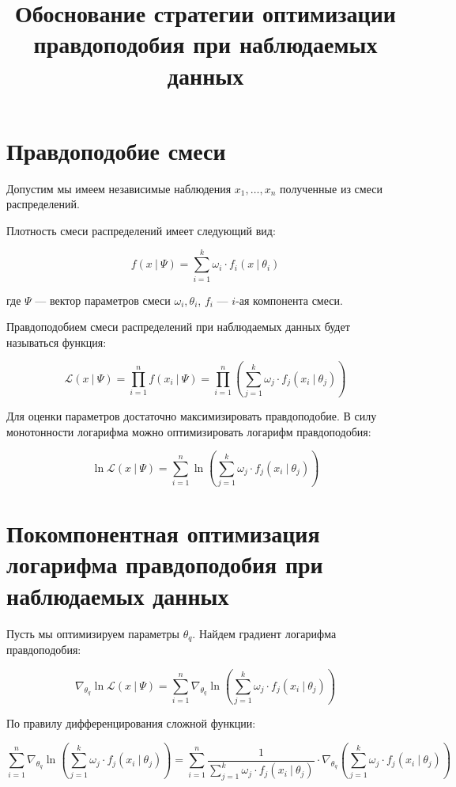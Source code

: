\documentclass[14pt, a4paper, oneside]{memoir}
\title{Обоснование стратегии оптимизации правдоподобия при наблюдаемых данных}
\begin{document}
\begin{titlingpage}
	\maketitle
\end{titlingpage}

\section{Правдоподобие смеси}

Допустим мы имеем независимые наблюдения $x_1, \dots, x_n$ полученные из смеси распределений.

Плотность смеси распределений имеет следующий вид:

\[f(x ~|~ \Psi) = \sum_{i=1}^k \omega_i \cdot f_i (x~|~\theta_i)\]

где $\Psi$ --- вектор параметров смеси $\omega_i, \theta_i$, $f_i$ --- $i$-ая компонента смеси.

Правдоподобием смеси распределений при наблюдаемых данных будет называться функция:

\[\mathcal{L}(x ~|~ \Psi) = \prod_{i=1}^n f(x_i ~|~ \Psi) = \prod_{i=1}^n \left(\sum_{j=1}^k \omega_j \cdot f_j(x_i ~|~ \theta_j)\right)\]

Для оценки параметров достаточно максимизировать правдоподобие. В силу монотонности логарифма можно оптимизировать логарифм правдоподобия:

\[\ln \mathcal{L}(x ~|~ \Psi) = \sum_{i=1}^n \ln \left(\sum_{j=1}^k \omega_j \cdot f_j(x_i~|~ \theta_j)\right)\]

\section{Покомпонентная оптимизация логарифма правдоподобия при наблюдаемых данных}

Пусть мы оптимизируем параметры $\theta_q$. Найдем градиент логарифма правдоподобия:

\[\nabla_{\theta_q} \ln \mathcal{L}(x ~|~ \Psi) = \sum_{i=1}^n \nabla_{\theta_q} \ln \left( \sum_{j=1}^k \omega_j \cdot f_j(x_i~|~ \theta_j)\right)\]

По правилу дифференцирования сложной функции:

\[\sum_{i=1}^n \nabla_{\theta_q} \ln \left( \sum_{j=1}^k \omega_j \cdot f_j(x_i~|~ \theta_j)\right) = \sum_{i=1}^n \frac{1}{\sum_{j=1}^k \omega_j \cdot f_j(x_i~|~ \theta_j)} \cdot \nabla_{\theta_q} \left(\sum_{j=1}^k \omega_j \cdot f_j(x_i~|~ \theta_j) \right)\]
\end{document}
